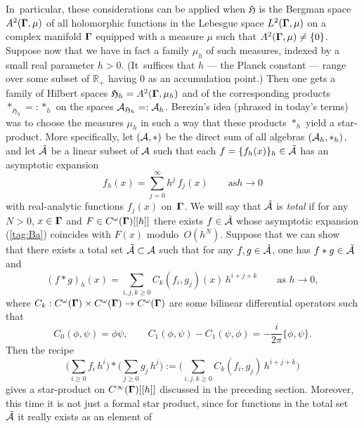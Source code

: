 \documentclass[12pt]{amsart}
\numberwithin{equation}{section}
\theoremstyle{remark}
\newcommand\AAA{{\Cal A}}
\newcommand\Omg{{\bigam}}   %
\newcommand\HH{\mathfrak H}
\newcommand\RR{\mathbb R}
\newcommand{\bigam}{\mbox{\boldmath $\Gamma$}}
\begin{document}
In~particular, these considerations can be applied when $\HH$ is the Bergman
space $A^2(\Omg,\mu)$ of all holomorphic functions in the Lebesgue space
$L^2(\Omg,\mu)$ on a complex manifold $\Omg$ equipped with a measure $\mu$
such that $A^2(\Omg,\mu)\neq\{0\}$. Suppose now that we have in fact a family
$\mu_h$ of such measures, indexed by a small real parameter $h>0$. (It~suffices
that $h$ --- the Planck constant --- range over some subset of $\RR_+$ having 0
as an accumulation point.) Then one gets a family of Hilbert spaces
$\HH_h=A^2(\Omg,\mu_h)$ and of the corresponding products $*_{\HH_h}=:*_h$ on
the spaces $\AAA_{\HH_h}=:\AAA_h$. Berezin's idea (phrased in today's terms)
was to choose the measures $\mu_h$ in such a way that these products $*_h$
yield a star-product. More specifically, let $(\AAA,*)$ be the direct sum of
all algebras $(\AAA_h,*_h)$, and let $\tilde\AAA$ be a linear subset of $\AAA$
such that each $f=\{f_h(x)\}_h\in\tilde\AAA$ has an asymptotic expansion
\begin{equation}  f_h(x) = \sum_{j=0}^\infty h^j \, f_j(x) \qquad\text{as
}h\to0  \label{tag:Ba}  \end{equation}
with real-analytic functions $f_j(x)$ on~$\Omg$. We will say that $\tilde
\AAA$ is {\it total\/} if for any $N>0$, $x\in\Omg$ and $F\in C^\omega(\Omg)
[[h]]$ there exists $f\in\tilde\AAA$ whose asymptotic expansion (\ref{tag:Ba})
coincides with $F(x)$ modulo~$O(h^N)$. Suppose that we can show that there
exists a total set $\tilde\AAA\subset\AAA$ such that for any
$f,g\in\tilde\AAA$, one has $f*g\in\tilde\AAA$ and
\begin{equation}  (f*g)_h(x) = \sum_{i,j,k\ge0} C_k(f_i,g_j)(x) \,h^{i+j+k}
\qquad \text{as } h\to0 ,  \label{tag:Bba}  \end{equation}
where $C_k:C^\omega(\Omg)\times C^\omega(\Omg)\to C^\omega(\Omg)$ are
some bilinear differential operators such that
\begin{equation}  C_0(\phi,\psi)=\phi\psi, \qquad C_1(\phi,\psi)-C_1(\psi,\phi)
= -\frac i{2\pi}\{\phi,\psi\}.  \label{tag:Bbd}  \end{equation}
Then the recipe
\begin{equation}  \Big( \sum_{i\ge0} f_i \, h^i\Big) * \Big(\sum_{j\ge0} g_j \,
h^j\Big) := \Big( \sum_{i,j,k\ge0} C_k(f_i,g_j) \, h^{i+j+k} \Big)
\label{tag:Bs}  \end{equation}
gives a star-product on $C^\infty(\Omg)[[h]]$ discussed in the preceding
section.  Moreover, this time it is not just a formal star product, since for
functions in the total set $\tilde\AAA$ it really exists as an element of
\end{document}
